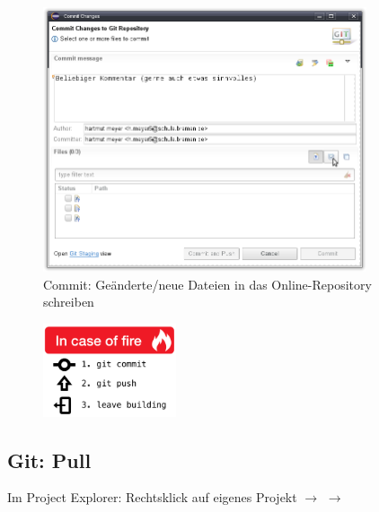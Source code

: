 \begin{figure}[h]
  \centering
   \includegraphics[width=0.85\textwidth]{./inf/SEKII/01_Vorbereitung/Git-Commit.png}
   \caption{Commit: Geänderte/neue Dateien in das Online-Repository schreiben}
   \label{fig:git-commit}
\end{figure}

\begin{figure}[h]
  \centering
   \includegraphics[width=0.35\textwidth]{./inf/SEKII/01_Vorbereitung/in-case-of-fire-1-git-commit-2-git-push-3-leave-building2.png}
\end{figure}

\subsection{Git: Pull}

Im Project Explorer: Rechtsklick auf eigenes Projekt $\rightarrow$ 
$\rightarrow$ 

\clearpage


